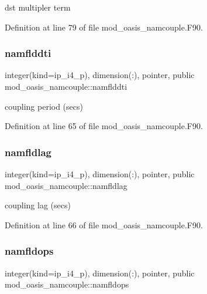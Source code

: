 dst multipler term 



Definition at line 79 of file mod\+\_\+oasis\+\_\+namcouple.\+F90.

\mbox{\label{namespacemod__oasis__namcouple_a9080617143dacb027f74c4c5158b5e58}} 
\subsubsection{\texorpdfstring{namflddti}{namflddti}}
{\footnotesize\ttfamily integer(kind=ip\+\_\+i4\+\_\+p), dimension(\+:), pointer, public mod\+\_\+oasis\+\_\+namcouple\+::namflddti}



coupling period (secs) 



Definition at line 65 of file mod\+\_\+oasis\+\_\+namcouple.\+F90.

\mbox{\label{namespacemod__oasis__namcouple_a6a4406ca14f91ef6514a18eb154e648f}} 
\subsubsection{\texorpdfstring{namfldlag}{namfldlag}}
{\footnotesize\ttfamily integer(kind=ip\+\_\+i4\+\_\+p), dimension(\+:), pointer, public mod\+\_\+oasis\+\_\+namcouple\+::namfldlag}



coupling lag (secs) 



Definition at line 66 of file mod\+\_\+oasis\+\_\+namcouple.\+F90.

\mbox{\label{namespacemod__oasis__namcouple_a4841e350d91926f5f8403e73442c76ad}} 
\subsubsection{\texorpdfstring{namfldops}{namfldops}}
{\footnotesize\ttfamily integer(kind=ip\+\_\+i4\+\_\+p), dimension(\+:), pointer, public mod\+\_\+oasis\+\_\+namcouple\+::namfldops}



